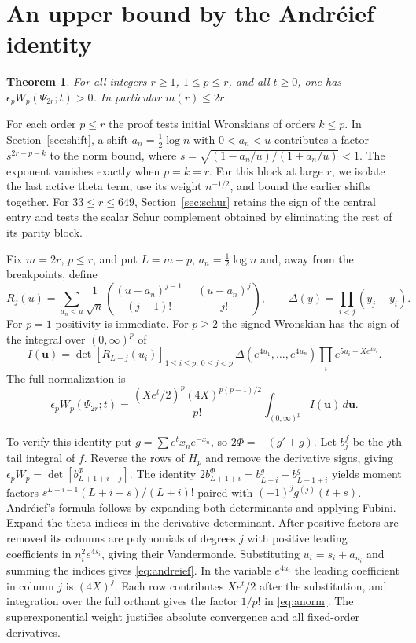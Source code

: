\documentclass[11pt,a4paper,reqno]{amsart}
\newtheorem{theorem}{Theorem}[section]
\numberwithin{equation}{section}
\begin{document}
\section{An upper bound by the Andréief identity}\label{sec:upper}


\begin{theorem}\label{th:upper}
For all integers \(r\ge1\), \(1\le p\le r\), and all \(t\ge0\), one has \(\epsilon_p W_p(\Psi_{2r};t)>0\). In particular \(m(r)\le2r\).
\end{theorem}


For each order \(p\le r\) the proof tests initial Wronskians of orders \(k\le p\). In Section~\ref{sec:shift}, a shift \(a_n=\tfrac12\log n\) with \(0<a_n<u\) contributes a factor \(s^{2r-p-k}\) to the norm bound, where \(s=\sqrt{(1-a_n/u)/(1+a_n/u)}<1\). The exponent vanishes exactly when \(p=k=r\). For this block at large \(r\), we isolate the last active theta term, use its weight \(n^{-1/2}\), and bound the earlier shifts together. For \(33\le r\le649\), Section~\ref{sec:schur} retains the sign of the central entry and tests the scalar Schur complement obtained by eliminating the rest of its parity block.

Fix \(m=2r\), \(p\le r\), and put \(L=m-p\), \(a_n=\frac12\log n\) and, away from the breakpoints, define \[R_j(u)=\sum_{a_n<u}\frac{1}{\sqrt n}\left(\frac{(u-a_n)^{j-1}}{(j-1)!}-\frac{(u-a_n)^j}{j!}\right),\qquad \Delta(y)=\prod_{i<j}(y_j-y_i).\] For \(p=1\) positivity is immediate. For \(p\ge2\) the signed Wronskian has the sign of the integral over \((0,\infty)^p\) of 
\begin{equation}\label{eq:andreief}
I(\mathbf u)=\det[R_{L+j}(u_i)]_{1\le i\le p,\ 0\le j<p}\,
 \Delta(e^{4u_1},\ldots,e^{4u_p})\prod_i e^{5u_i-Xe^{4u_i}}.
\end{equation}
The full normalization is
\begin{equation}\label{eq:anorm}
 \epsilon_p W_p(\Psi_{2r};t)=
 \frac{(Xe^t/2)^p(4X)^{p(p-1)/2}}{p!}
 \int_{(0,\infty)^p} I(\mathbf u)\,d\mathbf u .
\end{equation}

 To verify this identity put \(g=\sum e^t x_ne^{-x_n}\), so \(2\Phi=-(g'+g)\). Let \(b_j^f\) be the \(j\)th tail integral of \(f\). Reverse the rows of \(H_p\) and remove the derivative signs, giving \(\epsilon_pW_p=\det[b^\Phi_{L+1+i-j}]\). The identity \(2b_{L+1+i}^\Phi=b^g_{L+i}-b^g_{L+1+i}\) yields moment factors \(s^{L+i-1}(L+i-s)/(L+i)!\) paired with \((-1)^j g^{(j)}(t+s)\). Andréief's formula follows by expanding both determinants and applying Fubini. Expand the theta indices in the derivative determinant. After positive factors are removed its columns are polynomials of degrees \(j\) with positive leading coefficients in \(n_i^2e^{4s_i}\), giving their Vandermonde. Substituting \(u_i=s_i+a_{n_i}\) and summing the indices gives \eqref{eq:andreief}. In the variable \(e^{4u_i}\) the leading coefficient in column \(j\) is \((4X)^j\). Each row contributes \(Xe^t/2\) after the substitution, and integration over the full orthant gives the factor \(1/p!\) in \eqref{eq:anorm}. The superexponential weight justifies absolute convergence and all fixed-order derivatives.
\end{document}
